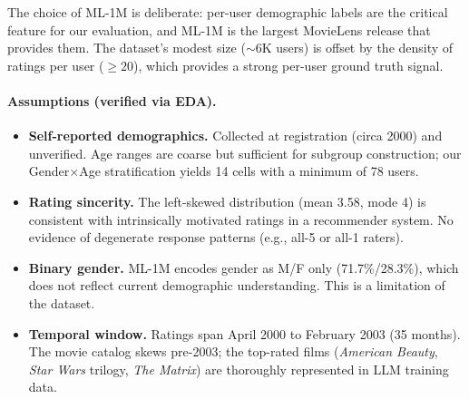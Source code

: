 The choice of ML-1M is deliberate: per-user demographic labels are the critical feature for our evaluation, and ML-1M is the largest MovieLens release that provides them.
The dataset's modest size (${\sim}6$K users) is offset by the density of ratings per user ($\geq 20$), which provides a strong per-user ground truth signal.

\paragraph{Assumptions (verified via EDA).}
\begin{itemize}
    \item \textbf{Self-reported demographics.} Collected at registration (circa 2000) and unverified. Age ranges are coarse but sufficient for subgroup construction; our Gender$\times$Age stratification yields 14 cells with a minimum of 78 users.
    \item \textbf{Rating sincerity.} The left-skewed distribution (mean 3.58, mode 4) is consistent with intrinsically motivated ratings in a recommender system. No evidence of degenerate response patterns (e.g., all-5 or all-1 raters).
    \item \textbf{Binary gender.} ML-1M encodes gender as M/F only (71.7\%/28.3\%), which does not reflect current demographic understanding. This is a limitation of the dataset.
    \item \textbf{Temporal window.} Ratings span April 2000 to February 2003 (35 months). The movie catalog skews pre-2003; the top-rated films (\emph{American Beauty}, \emph{Star Wars} trilogy, \emph{The Matrix}) are thoroughly represented in LLM training data.
\end{itemize}

